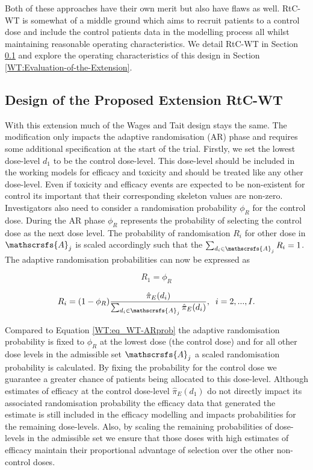 Both of these approaches have their own merit but also have flaws as well. RtC-WT is somewhat of a middle ground which aims to recruit patients to a control dose and include the control patients data in the modelling process all whilst maintaining reasonable operating characteristics. We detail RtC-WT in Section \ref{WT:Design-RtC-WT} and explore the operating characteristics of this design in Section \ref{WT:Evaluation-of-the-Extension}.


\subsection{Design of the Proposed Extension RtC-WT}
\label{WT:Design-RtC-WT}

With this extension much of the Wages and Tait design stays the same. The modification only impacts the adaptive randomisation (AR) phase and requires some additional specification at the start of the trial. Firstly, we set the lowest dose-level $d_1$ to be the control dose-level. This dose-level should be included in the working models for efficacy and toxicity and should be treated like any other dose-level. Even if toxicity and efficacy events are expected to be non-existent for control its important that their corresponding skeleton values are non-zero. Investigators also need to consider a randomisation probability $\phi_R$ for the control dose. During the AR phase $\phi_R$ represents the probability of selecting the control dose as the next dose level. The probability of randomisation $R_i$ for other dose in $\mathscrsfs{A}_j$ is scaled accordingly such that the $\sum_{d_i \in \mathscrsfs{A}_j} R_i = 1$. The adaptive randomisation probabilities can now be expressed as 

\begin{equation}
R_1 = \phi_R
\end{equation}

\begin{equation}
R_i = (1-\phi_R)\frac{\hat{\pi}_E(d_i)}{\sum_{d_i \in \mathscrsfs{A}_j}\hat{\pi}_E(d_i)}, \; \; i=2,...,I. 
\end{equation}

Compared to Equation \ref{WT:eq_WT-ARprob} the adaptive randomisation probability is fixed to $\phi_R$ at the lowest dose (the control dose) and for all other dose levels in the admissible set $\mathscrsfs{A}_j$ a scaled randomisation probability is calculated. By fixing the probability for the control dose we guarantee a greater chance of patients being allocated to this dose-level. Although estimates of efficacy at the control dose-level $\hat{\pi}_E(d_1)$ do not directly impact its associated randomisation probability the efficacy data that generated the estimate is still included in the efficacy modelling and impacts probabilities for the remaining dose-levels. Also, by scaling the remaining probabilities of dose-levels in the admissible set we ensure that those doses with high estimates of efficacy maintain their proportional advantage of selection over the other non-control doses.

